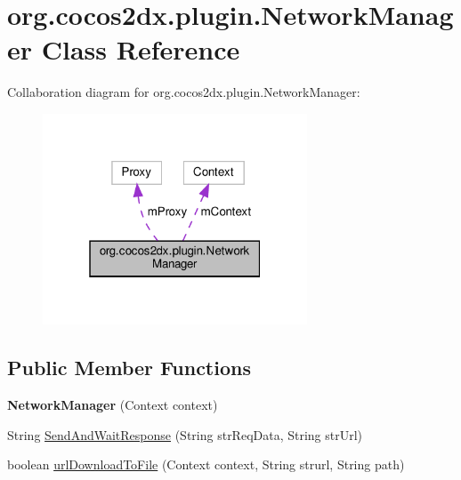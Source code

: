 \hypertarget{classorg_1_1cocos2dx_1_1plugin_1_1NetworkManager}{}\section{org.\+cocos2dx.\+plugin.\+Network\+Manager Class Reference}
\label{classorg_1_1cocos2dx_1_1plugin_1_1NetworkManager}


Collaboration diagram for org.\+cocos2dx.\+plugin.\+Network\+Manager\+:
\nopagebreak
\begin{figure}[H]
\begin{center}
\leavevmode
\includegraphics[width=223pt]{classorg_1_1cocos2dx_1_1plugin_1_1NetworkManager__coll__graph}
\end{center}
\end{figure}
\subsection*{Public Member Functions}
\begin{DoxyCompactItemize}
\item 
\mbox{\label{classorg_1_1cocos2dx_1_1plugin_1_1NetworkManager_adca6e1542a1be90a7a24b684f26b7e03}} 
{\bfseries Network\+Manager} (Context context)
\item 
String \hyperlink{classorg_1_1cocos2dx_1_1plugin_1_1NetworkManager_af1fe795e1cfdea8c38535b9059e267ef}{Send\+And\+Wait\+Response} (String str\+Req\+Data, String str\+Url)
\item 
boolean \hyperlink{classorg_1_1cocos2dx_1_1plugin_1_1NetworkManager_a0b430319e501f923ffb595ef0582567e}{url\+Download\+To\+File} (Context context, String strurl, String path)
\end{DoxyCompactItemize}


